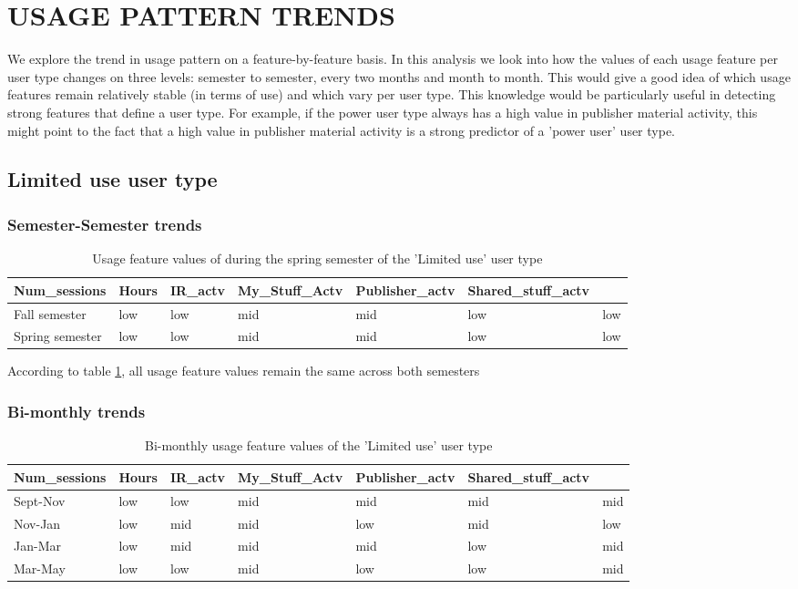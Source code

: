 \documentclass{acm_proc_article-sp}
\begin{document}
\section{USAGE PATTERN TRENDS}
We explore the trend in usage pattern on a feature-by-feature basis. In this analysis we look into how the values of each usage feature per user type changes on three levels: semester to semester, every two months and month to month. This would give a good idea of which usage features remain relatively stable (in terms of use) and which vary per user type. This knowledge would be particularly useful in detecting strong features that define a user type. For example, if the power user type always has a high value in  publisher material activity, this  might point to the fact that a high value in publisher material activity is a strong predictor of a 'power user' user type.
\subsection{Limited use user type}
\subsubsection{Semester-Semester trends}
\begin{table}
\caption{Usage feature values of during the spring semester of the 'Limited use' user type}
\label{cluster0month}
\begin{tabular}{|p{}|p{1cm}|p{1cm}|p{1cm}|p{1cm}|p{1cm}|p{1cm}|}
 Num\_sessions & Hours & IR\_actv & My\_Stuff\_Actv & Publisher\_actv & Shared\_stuff\_actv \\ \hline
 Fall  semester & low & low  & mid & mid & low & low \\ \hline
Spring semester & low & low  & mid & mid & low & low \\ \hline
\end{tabular}
\end{table}
According to table \ref{cluster0month}, all usage feature values remain the same across both semesters
\subsubsection{Bi-monthly trends}
\begin{table}
\caption{Bi-monthly usage feature values of the 'Limited use' user type}
\label{cluster0bimonthly}
\begin{tabular}{|p{}|p{1cm}|p{1cm}|p{1cm}|p{1cm}|p{1cm}|p{1cm}|}
 Num\_sessions & Hours & IR\_actv & My\_Stuff\_Actv & Publisher\_actv & Shared\_stuff\_actv \\ \hline
Sept-Nov & low & low  & mid & mid & mid & mid \\ \hline
Nov-Jan & low & mid  & mid & low & mid & low \\ \hline
Jan-Mar & low & mid  & mid & mid & low & mid \\ \hline
Mar-May & low & low  & mid & low & low & mid \\ \hline
\end{tabular}
\end{table}
\end{document}

